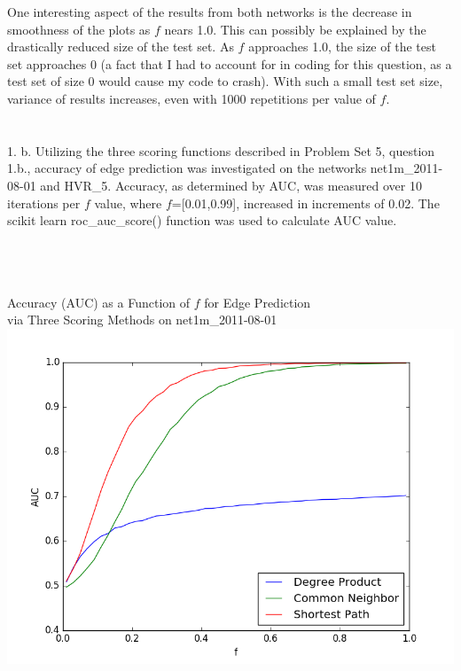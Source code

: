 \documentclass[11pt, oneside]{article}   	%
\begin{document}
\indent One interesting aspect of the results from both networks is the decrease in smoothness of the plots as $f$ nears 1.0.  This can possibly be explained by the drastically reduced size of the test set.  As $f$ approaches 1.0, the size of the test set approaches 0 (a fact that I had to account for in coding for this question, as a test set of size 0 would cause my code to crash).  With such a small test set size, variance of results increases, even with 1000 repetitions per value of $f$.\\\\\\
1. b.  Utilizing the three scoring functions described in Problem Set 5, question 1.b., accuracy of edge prediction was investigated on the networks net1m\_2011-08-01 and HVR\_5.  Accuracy, as determined by AUC, was measured over 10 iterations per $f$ value, where $f$=[0.01,0.99], increased in increments of 0.02.  The scikit learn roc\_auc\_score() function was used to calculate AUC value.\\\\\\\\
\begin{center}Accuracy (AUC) as a Function of $f$ for Edge Prediction\\via Three Scoring Methods on net1m\_2011-08-01 \includegraphics[scale=0.5]{predictEdgesnet1m_2011-08-0110Iterations.png}\end{center}
\end{document}
